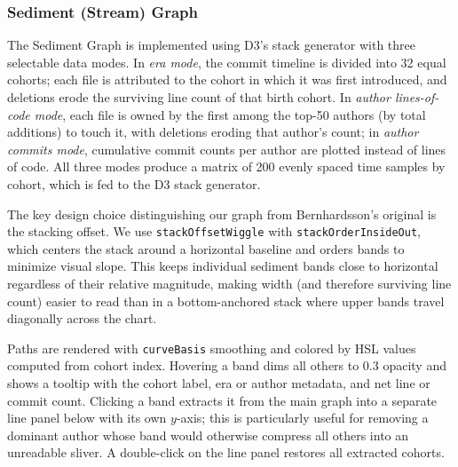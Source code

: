 \documentclass[12 pt]{article}
\begin{document}
\subsubsection*{Sediment (Stream) Graph}
The Sediment Graph is implemented using D3's stack generator with three
selectable data modes.
In \textit{era mode}, the commit timeline is divided into 32 equal cohorts;
each file is attributed to the cohort in which it was first introduced, and
deletions erode the surviving line count of that birth cohort.
In \textit{author lines-of-code mode}, each file is owned by the first among
the top-50 authors (by total additions) to touch it, with deletions eroding
that author's count; in \textit{author commits mode}, cumulative commit
counts per author are plotted instead of lines of code.
All three modes produce a matrix of 200 evenly spaced time samples by
cohort, which is fed to the D3 stack generator.

The key design choice distinguishing our graph from Bernhardsson's original
is the stacking offset.
We use \texttt{stackOffsetWiggle} with \texttt{stackOrderInsideOut}, which
centers the stack around a horizontal baseline and orders bands to minimize
visual slope.
This keeps individual sediment bands close to horizontal regardless of their
relative magnitude, making width (and therefore surviving line count) easier
to read than in a bottom-anchored stack where upper bands travel diagonally
across the chart.

Paths are rendered with \texttt{curveBasis} smoothing and colored by HSL
values computed from cohort index.
Hovering a band dims all others to 0.3 opacity and shows a tooltip with the
cohort label, era or author metadata, and net line or commit count.
Clicking a band extracts it from the main graph into a separate line panel
below with its own $y$-axis; this is particularly useful for removing a
dominant author whose band would otherwise compress all others into an
unreadable sliver.
A double-click on the line panel restores all extracted cohorts. \par
\end{document}
